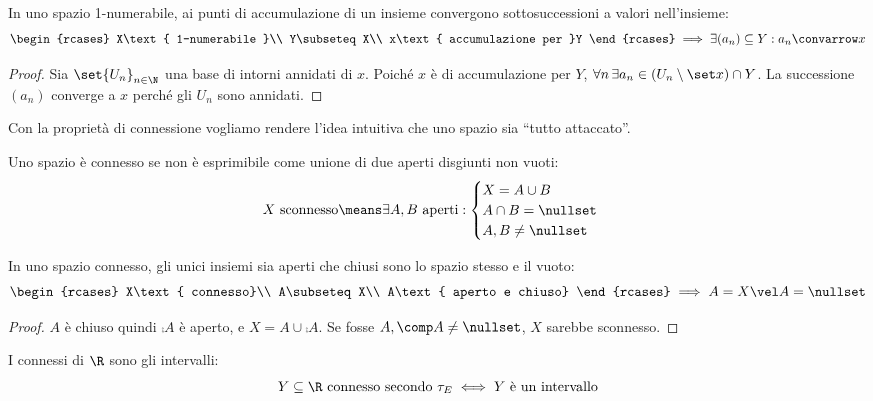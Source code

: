 \begin{prop}
	\label{th:1numaccsucc}
	In uno spazio 1-numerabile, ai punti di accumulazione di un insieme convergono sottosuccessioni a valori nell'insieme:
	\[\begin{rcases}
		X\text{ 1-numerabile }\\
		Y\subseteq X\\
		x\text{ accumulazione per }Y
	\end{rcases}\implies
	\exists(a_n)\subseteq Y:a_n\convarrow x\]
\end{prop}

\begin{proof}
	Sia $\set{U_n}_{n\in\N}$ una base di intorni annidati di $x$.
	Poiché $x$ è di accumulazione per $Y$,
	$\forall n\,\exists a_n\in(U_n\setminus\set x)\cap Y$.
	La successione $(a_n)$ converge a $x$ perché gli $U_n$ sono annidati.
\end{proof}


Con la proprietà di connessione vogliamo rendere l'idea intuitiva che uno spazio sia ``tutto attaccato''.

\begin{defn}[Connessione]
	Uno spazio è connesso se non è esprimibile come unione di due aperti disgiunti non vuoti:
	\[X\text{ sconnesso}\means
	\exists A,B\text{ aperti}:
	\begin{cases}
		X=A\cup B\\
		A\cap B=\nullset\\
		A,B\neq\nullset
	\end{cases}\]
\end{defn}

\begin{prop}
	In uno spazio connesso, gli unici insiemi sia aperti che chiusi sono lo spazio stesso e il vuoto:
	\[\begin{rcases}
		X\text{ connesso}\\
		A\subseteq X\\
		A\text{ aperto e chiuso}
	\end{rcases}\implies A=X\vel A=\nullset\]
\end{prop}

\begin{proof}
	$A$ è chiuso quindi $\comp A$ è aperto,
	e $X=A\cup\comp A$.
	Se fosse $A,\comp A\neq\nullset$,
	$X$ sarebbe sconnesso.
\end{proof}

\begin{prop}
	I connessi di $\R$ sono gli intervalli:
	\[Y\subseteq\R\text{ connesso secondo }\tau_E\iff
	Y\text{ è un intervallo}\]
\end{prop}

